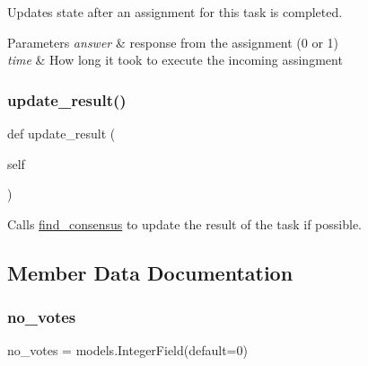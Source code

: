 Updates state after an assignment for this task is completed. 


\begin{DoxyParams}{Parameters}
{\em answer} & response from the assignment (0 or 1) \\
\hline
{\em time} & How long it took to execute the incoming assingment \\
\hline
\end{DoxyParams}
\mbox{\label{classjoinapp_1_1models_1_1task__management__models_1_1_j_f_task_a9013f18300fef58695383b65dd3ad816}} 
\subsubsection{\texorpdfstring{update\_result()}{update\_result()}}
{\footnotesize\ttfamily def update\+\_\+result (\begin{DoxyParamCaption}\item[{}]{self }\end{DoxyParamCaption})}



Calls \mbox{\hyperlink{namespacejoinapp_1_1find__consensus}{find\+\_\+consensus}} to update the result of the task if possible. 



\subsection{Member Data Documentation}
\mbox{\label{classjoinapp_1_1models_1_1task__management__models_1_1_j_f_task_a1e1b32e1e9767af8d38c4e2de888919f}} 
\subsubsection{\texorpdfstring{no\_votes}{no\_votes}}
{\footnotesize\ttfamily no\+\_\+votes = models.\+Integer\+Field(default=0)\hspace{0.3cm}{\ttfamily [static]}}

\mbox{\label{classjoinapp_1_1models_1_1task__management__models_1_1_j_f_task_afc259a6f918180e978f96108b03d3411}} 
